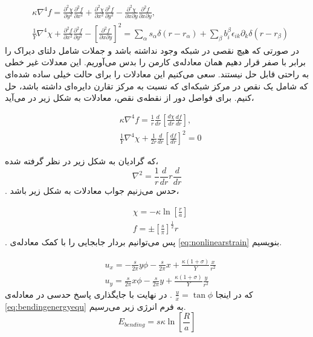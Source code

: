 \begin{equation}
\begin{aligned}
&\kappa\nabla^4f=\frac{\partial^2\chi}{\partial y^2}\frac{\partial^2f}{\partial x^2}+\frac{\partial^2\chi}{\partial x^2}\frac{\partial^2f}{\partial y^2}-\frac{\partial^2\chi}{\partial x\partial y}\frac{\partial^2f}{\partial x\partial y},\\
&\frac{1}{Y}\nabla^4\chi+\frac{\partial^2f}{\partial x^2}\frac{\partial^2f}{\partial y^2}-\left[\frac{\partial^2f}{\partial x\partial y}\right]^2=\sum_\alpha s_\alpha \delta(r-r_\alpha)+\sum_\beta b_i^\beta \epsilon_{ik}\partial_k\delta(r-r_\beta)
\end{aligned}
\end{equation}
در صورتی که هیچ نقصی در شبکه وجود نداشته باشد و جملات شامل دلتای دیراک را برابر با صفر قرار دهیم همان معادله‌ی کارمن
 را بدس می‌آوریم. این معدلات غیر خطی به راحتی قابل حل نیستند. سعی می‌کنیم این معادلات را برای حالت خیلی ساده شده‌ای که شامل یک نقص در مرکز شبکه‌ای که نسبت به مرکز تقارن دایره‌ای داشته باشد، حل کنیم. برای فواصل دور از نقطه‌ی نقص،‌ معادلات به شکل زیر در می‌آید،

\begin{equation}
\begin{aligned}
&\kappa\nabla^4f=\frac{1}{r}\frac{d}{dr}\left[\frac{d\chi}{dr}\frac{df}{dr}\right],\\
&\frac{1}{Y}\nabla^4\chi+\frac{1}{2r}\frac{d}{dr}\left[\frac{df}{dr}\right]^2=0
\end{aligned}
\end{equation}

که گرادیان به شکل زیر در نظر گرفته شده،
\begin{equation}
\nabla^2=\frac{1}{r}\frac{d}{dr}r\frac{d}{dr}
\end{equation}
. حدس می‌زنیم جواب معادلات به شکل زیر باشد،


\begin{equation}
\begin{aligned}
&\chi=-\kappa\ln\left[\frac{r}{a}\right]\\
&f=\pm\left[\frac{s}{\pi}\right]^{\frac{1}{2}}r
\end{aligned}
\end{equation}
. پس می‌توانیم بردار جابجایی را با کمک معادله‌ی 
\ref{eq:nonlinearstrain}
بنویسیم. 

\begin{equation}
\begin{aligned}
&u_x=-\frac{s}{2\pi}y\phi-\frac{s}{2\pi}x+\frac{\kappa(1+\sigma)}{Y}\frac{x}{r^2}\\
&u_y=\frac{s}{2\pi}x\phi-\frac{s}{2\pi}y+\frac{\kappa(1+\sigma)}{Y}\frac{y}{r^2}
\end{aligned}
\end{equation}
که در اینجا
$\frac{y}{x}=\tan\phi$
. در نهایت با جایگذاری پاسخ حدسی در معادله‌ی
\ref{eq:bendingenergyequ}
به فرم انرژی زیر می‌رسیم.
\begin{equation}
E_{bending}= s\kappa\ln\left[\frac{R}{a}\right]
\end{equation}







